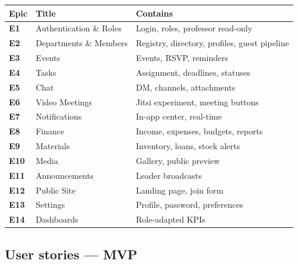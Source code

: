 \documentclass[12pt,a4paper]{report}
\begin{document}
\begin{center}
\begin{tabular}{>{\bfseries}p{1.2cm} p{4.6cm} p{6.4cm}}
\toprule
\textbf{Epic} & \textbf{Title} & \textbf{Contains} \\
\midrule
E1  & Authentication \& Roles     & Login, roles, professor read-only \\
E2  & Departments \& Members      & Registry, directory, profiles, guest pipeline \\
E3  & Events                      & Events, RSVP, reminders \\
E4  & Tasks                       & Assignment, deadlines, statuses \\
E5  & Chat                        & DM, channels, attachments \\
E6  & Video Meetings              & Jitsi experiment, meeting buttons \\
E7  & Notifications               & In-app center, real-time \\
E8  & Finance                     & Income, expenses, budgets, reports \\
E9  & Materials                   & Inventory, loans, stock alerts \\
E10 & Media                       & Gallery, public preview \\
E11 & Announcements               & Leader broadcasts \\
E12 & Public Site                 & Landing page, join form \\
E13 & Settings                    & Profile, password, preferences \\
E14 & Dashboards                  & Role-adapted KPIs \\
\bottomrule
\end{tabular}
\end{center}

\subsection{User stories — MVP}
\end{document}
